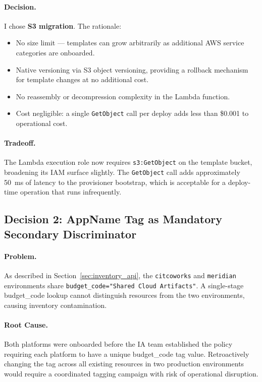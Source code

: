 \paragraph{Decision.} I chose \textbf{S3 migration}. The rationale:

\begin{itemize}
    \item No size limit --- templates can grow arbitrarily as additional
          AWS service categories are onboarded.
    \item Native versioning via S3 object versioning, providing a rollback
          mechanism for template changes at no additional cost.
    \item No reassembly or decompression complexity in the Lambda function.
    \item Cost negligible: a single \texttt{GetObject} call per deploy
          adds less than \$0.001 to operational cost.
\end{itemize}

\paragraph{Tradeoff.}
The Lambda execution role now requires \texttt{s3:GetObject} on the
template bucket, broadening its IAM surface slightly. The
\texttt{GetObject} call adds approximately 50~ms of latency to the
provisioner bootstrap, which is acceptable for a deploy-time operation
that runs infrequently.

\subsection{Decision 2: AppName Tag as Mandatory Secondary Discriminator}
\label{sec:decision_appname}

\paragraph{Problem.}
As described in Section~\ref{sec:inventory_api}, the \texttt{citcoworks}
and \texttt{meridian} environments share \texttt{budget\_code="Shared Cloud
Artifacts"}. A single-stage budget\_code lookup cannot distinguish
resources from the two environments, causing inventory contamination.

\paragraph{Root Cause.}
Both platforms were onboarded before the IA team established the
policy requiring each platform to have a unique
budget\_code tag value. Retroactively changing the tag across
all existing resources in two production environments would require
a coordinated tagging campaign with risk of operational disruption.

